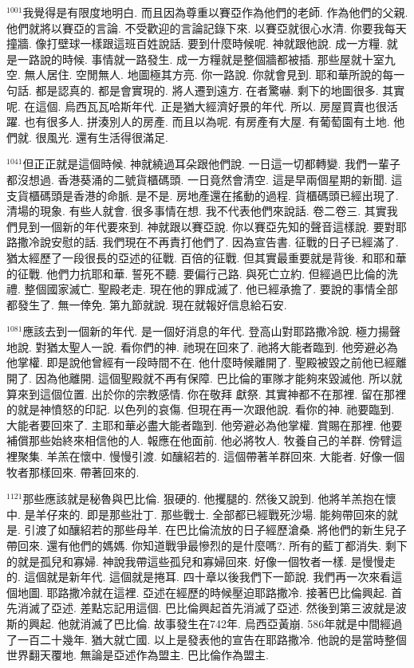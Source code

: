 \documentclass{book}
\begin{document}
$^{1001}$我覺得是有限度地明白.
而且因為尊重以賽亞作為他們的老師.
作為他們的父親.
他們就將以賽亞的言論.
不受歡迎的言論記錄下來.
以賽亞就很心水清.
你要我每天撞牆.
像打壁球一樣跟這班百姓說話.
要到什麼時候呢.
神就跟他說.
成一方糧.
就是一路說的時候.
事情就一路發生.
成一方糧就是整個牆都被插.
那些屋就十室九空.
無人居住.
空閒無人.
地圖極其方亮.
你一路說.
你就會見到.
耶和華所說的每一句話.
都是認真的.
都是會實現的.
將人遷到遠方.
在者驚嚇.
剩下的地圖很多.
其實呢.
在這個.
烏西瓦瓦哈斯年代.
正是猶大經濟好景的年代.
所以.
房屋買賣也很活躍.
也有很多人.
拼湊別人的房產.
而且以為呢.
有房產有大屋.
有葡萄園有土地.
他們就.
很風光.
還有生活得很滿足.

$^{1041}$但正正就是這個時候.
神就繞過耳朵跟他們說.
一日這一切都轉變.
我們一輩子都沒想過.
香港葵涌的二號貨櫃碼頭.
一日竟然會清空.
這是早兩個星期的新聞.
這支貨櫃碼頭是香港的命脈.
是不是.
房地產還在搖動的過程.
貨櫃碼頭已經出現了.
清場的現象.
有些人就會.
很多事情在想.
我不代表他們來說話.
卷二卷三.
其實我們見到一個新的年代要來到.
神就跟以賽亞說.
你以賽亞先知的聲音這樣說.
要對耶路撒冷說安慰的話.
我們現在不再責打他們了.
因為宣告書.
征戰的日子已經滿了.
猶太經歷了一段很長的亞述的征戰.
百倍的征戰.
但其實最重要就是背後.
和耶和華的征戰.
他們力抗耶和華.
誓死不聽.
要偏行己路.
與死亡立約.
但經過巴比倫的洗禮.
整個國家滅亡.
聖殿老走.
現在他的罪成滅了.
他已經承擔了.
要說的事情全部都發生了.
無一倖免.
第九節就說.
現在就報好信息給石安.

$^{1081}$應該去到一個新的年代.
是一個好消息的年代.
登高山對耶路撒冷說.
極力揚聲地說.
對猶太聖人一說.
看你們的神.
祂現在回來了.
祂將大能者臨到.
他旁避必為他掌權.
即是說他曾經有一段時間不在.
他什麼時候離開了.
聖殿被毀之前他已經離開了.
因為他離開.
這個聖殿就不再有保障.
巴比倫的軍隊才能夠來毀滅他.
所以就算來到這個位置.
出於你的宗教感情.
你在敬拜 獻祭.
其實神都不在那裡.
留在那裡的就是神憤怒的印記.
以色列的哀傷.
但現在再一次跟他說.
看你的神.
祂要臨到.
大能者要回來了.
主耶和華必盡大能者臨到.
他旁避必為他掌權.
賞賜在那裡.
他要補償那些始終來相信他的人.
報應在他面前.
他必將牧人.
牧養自己的羊群.
傍臂這裡聚集.
羊羔在懷中.
慢慢引渡.
如釀紹若的.
這個帶著羊群回來.
大能者.
好像一個牧者那樣回來.
帶著回來的.

$^{1121}$那些應該就是秘魯與巴比倫.
狠硬的.
他攫腿的.
然後又說到.
他將羊羔抱在懷中.
是羊仔來的.
即是那些壯丁.
那些戰士.
全部都已經戰死沙場.
能夠帶回來的就是.
引渡了如釀紹若的那些母羊.
在巴比倫流放的日子經歷滄桑.
將他們的新生兒子帶回來.
還有他們的媽媽.
你知道戰爭最慘烈的是什麼嗎?.
所有的藍丁都消失.
剩下的就是孤兒和寡婦.
神說我帶這些孤兒和寡婦回來.
好像一個牧者一樣.
是慢慢走的.
這個就是新年代.
這個就是捲耳.
四十章以後我們下一節說.
我們再一次來看這個地圖.
耶路撒冷就在這裡.
亞述在經歷的時候壓迫耶路撒冷.
接著巴比倫興起.
首先消滅了亞述.
差點忘記用這個.
巴比倫興起首先消滅了亞述.
然後到第三波就是波斯的興起.
他就消滅了巴比倫.
故事發生在742年.
烏西亞黃崩.
586年就是中間經過了一百二十幾年.
猶大就亡國.
以上是發表他的宣告在耶路撒冷.
他說的是當時整個世界翻天覆地.
無論是亞述作為盟主.
巴比倫作為盟主.
\end{document}
